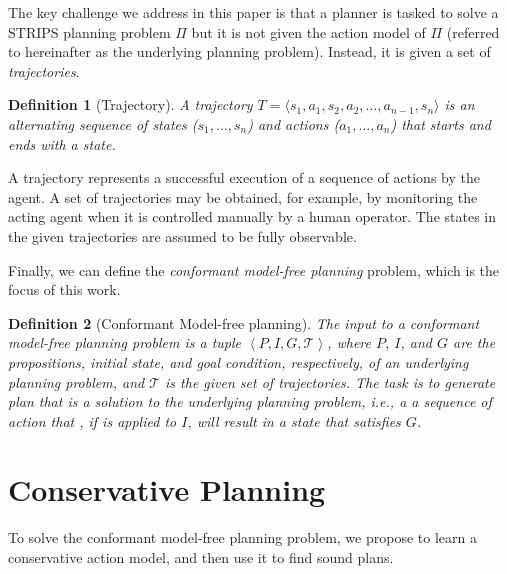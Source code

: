 \documentclass[letterpaper]{article}
\newtheorem{definition}{Definition}
\newcommand{\tuple}[1]{\ensuremath{\left \langle #1 \right \rangle }}
\begin{document}
The key challenge we address in this paper is that a planner is tasked to solve a STRIPS planning problem $\Pi$ but 
it is not given the action model of $\Pi$ (referred to hereinafter as the underlying planning problem). Instead, it is given a set of {\em trajectories}. 
\begin{definition}[Trajectory]
A trajectory $T=\langle s_1, a_1, s_2, a_2, \ldots, a_{n-1}, s_n\rangle$ is an alternating sequence of states ($s_1,\ldots,s_n$) and actions ($a_1,\ldots,a_n$) that starts and ends with a state. 
\end{definition}
A trajectory represents a successful execution of a sequence of actions by the agent. A set of trajectories may be obtained, for example, by monitoring the acting agent when it is controlled manually by a human operator. The states in the given trajectories are assumed to be fully observable. 


Finally, we can define the {\em conformant model-free planning} problem, which is the focus of this work. 
\begin{definition}[Conformant Model-free planning]
The input to a conformant model-free planning problem is a tuple $\tuple{P,I,G, \mathcal{T}}$, 
where $P$, $I$, and $G$ are the propositions, initial state, and goal condition, respectively, of an underlying planning problem, and $\mathcal{T}$ is the given set of trajectories. The task is to generate plan that
is a solution to the underlying planning problem, 
i.e.,  a a sequence of action that , if is applied to $I$, will result in a state that satisfies $G$.
\label{def:model-free-planning}
\end{definition}


\section{Conservative Planning}
To solve the conformant model-free planning problem, we propose to learn a conservative action model, and then use it to find sound plans.
\end{document}
